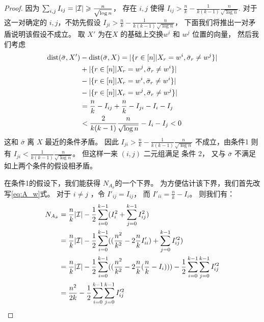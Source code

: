 \begin{proof}
    因为 $\sum_{i,j} I_{ij} = |\mathcal{I}| \geqslant \frac{n}{\sqrt{\log n}}$，
    存在 $i,j$ 使得
    $I_{ij} > \frac{n}{k} - \frac{1}{k(k-1)}\frac{n}{\sqrt{\log n}}$.
    对于这一对确定的 $i,j$，不妨先假设 $I_{ji} > \frac{n}{k} - \frac{1}{k(k-1)}\frac{n}{\sqrt{\log n}}$，
    下面我们将推出一对矛盾说明该假设不成立。
    取 $X'$ 为在$X$ 的基础上交换$w^i$ 和 $w^j$ 位置的向量，
    然后我们考虑
  \begin{align}
     \operatorname{dist}(\bar{\sigma}, X') & - \operatorname{dist}(\bar{\sigma}, X)= |\{ r \in [n]|X_r=w^i, \bar{\sigma}_r \neq w^j \}| \notag\\
    &+ |\{ r \in [n]|X_r=w^j, \bar{\sigma}_r \neq w^i \}| \notag\\
    &-|\{ r \in [n]|X_r=w^i, \bar{\sigma}_r \neq w^i \}| \notag\\
    &- |\{ r \in [n]|X_r=w^j, \bar{\sigma}_r \neq w^j \}| \notag\\
    & = \frac{n}{k} - I_{ij} +  \frac{n}{k} - I_{ji} - I_i - I_j\label{eq:distsmall} \\
    & < \frac{2}{k(k-1)}\frac{n}{\sqrt{\log n}} - I_i - I_j < 0\notag
    \end{align}
    这和 $\bar{\sigma}$ 离 $X$ 最近的条件矛盾。
    因此
    $I_{ji} > \frac{n}{k} - \frac{1}{k(k-1)}\frac{n}{\sqrt{\log n}}$
    不成立，由条件1
    则有  $I_{ji} < \frac{1}{k(k-1)}\frac{n}{\sqrt{\log n}}$。
    但这样一来 $(i, j)$ 二元组满足 条件 2，
    又与 $\bar{\sigma}$ 不满足如上两个条件的假设相矛盾。
    
    在条件1的假设下，我们能获得 $N_{A_{\bar{\sigma}}}$的一个下界。
    为方便估计该下界，我们首先改写\eqref{eq:A_w}式。
    对于 $i\neq j$ ，令 $I'_{ij} = I_{ij}$，
    而 $I'_{ii} = \frac{n}{k} - I_i$。
    则我们有：
    \begin{align*}
    N_{A_{\bar{\sigma}}} &=
    \frac{n}{k}|\mathcal{I}| - \frac{1}{2}\sum_{i=0}^{k-1}
    (I^2_i + \sum_{j=0}^{k-1} I^2_{ij}) \\
    &=
    \frac{n}{k}|\mathcal{I}| - \frac{1}{2}\sum_{i=0}^{k-1}
    ((\frac{n^2}{k^2} - 2\frac{n}{k} I'_{ii}) +
    \sum_{j=0}^{k-1} I'^2_{ij}) \\
    &=
    \frac{n}{k}|\mathcal{I}| - \frac{1}{2}\sum_{i=0}^{k-1}
    ((\frac{n^2}{k^2} - 2\frac{n}{k} (\frac{n}{k} - I_i)))
    - \frac{1}{2}\sum_{i=0}^{k-1}\sum_{j=0}^{k-1} I'^2_{ij} \\
    &= \frac{n^2}{2k} - \frac{1}{2}
    \sum_{i=0}^{k-1} \sum_{j=0}^{k-1} I'^2_{ij}
   \end{align*}
    

\end{proof}
